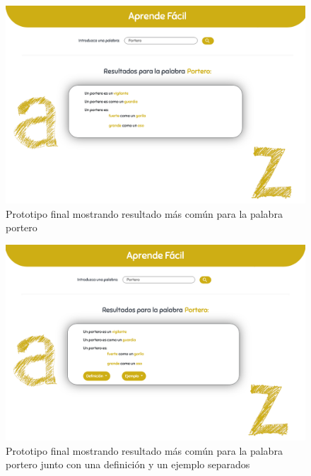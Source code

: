 
	\begin{figure}[!t]
		\includegraphics[width=.8\textwidth]{Imagenes/Bitmap/Mockups/mockup1_irene_final.png}
		\centering
		\caption{Prototipo final mostrando resultado más común para la palabra portero}
		\label{fig:mockup1irene_vFinal}
	\end{figure}

	\begin{figure}[!t]
	\includegraphics[width=.8\textwidth]{Imagenes/Bitmap/Mockups/mockup2_irene_final_v1.png}
	\centering
	\caption{Prototipo final mostrando resultado más común para la palabra portero junto con una definición y un ejemplo separados}
	\label{fig:mockup2irene_v1_vFinal}
	\end{figure}
	 
